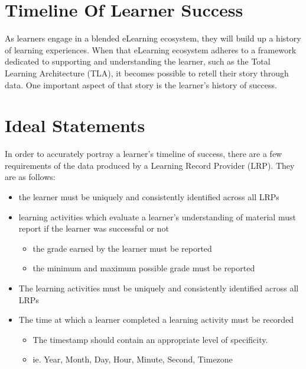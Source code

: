 \documentclass{article}
\begin{document}
\section*{Timeline Of Learner Success}
As learners engage in a blended eLearning ecosystem, they will build up a history of learning experiences. When that eLearning ecosystem adheres to a framework dedicated to supporting and understanding the learner, such as the Total Learning Architecture (TLA), it becomes possible to retell their story through data. One important aspect of that story is the learner's history of success.

\section{Ideal Statements}
In order to accurately portray a learner's timeline of success, there are a few requirements of the data produced by a Learning Record Provider (LRP). They are as follows:
\begin{itemize}
\item the learner must be uniquely and consistently identified across all LRPs
\item learning activities which evaluate a learner's understanding of material must report if the learner was successful or not
  \begin{itemize}
  \item the grade earned by the learner must be reported
  \item the minimum and maximum possible grade must be reported
  \end{itemize}
\item The learning activities must be uniquely and consistently identified across all LRPs
\item The time at which a learner completed a learning activity must be recorded
  \begin{itemize}
  \item The timestamp should contain an appropriate level of specificity.
  \item ie. Year, Month, Day, Hour, Minute, Second, Timezone
  \end{itemize}
\end{itemize}
\end{document}
